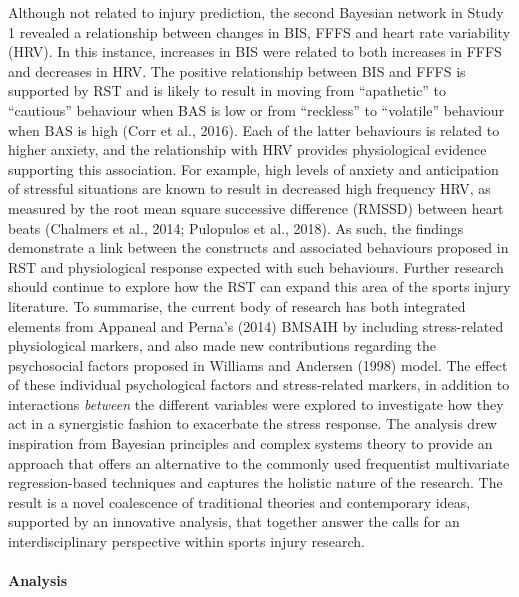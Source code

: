 \documentclass[man,floatsintext]{apa6}
\let\oldparagraph\paragraph
\renewcommand{\paragraph}[1]{\oldparagraph{#1}\mbox{}}
\begin{document}
Although not related to injury prediction, the second Bayesian network in Study 1 revealed a relationship between changes in BIS, FFFS and heart rate variability (HRV).
In this instance, increases in BIS were related to both increases in FFFS and decreases in HRV.
The positive relationship between BIS and FFFS is supported by RST and is likely to result in moving from \enquote{apathetic} to \enquote{cautious} behaviour when BAS is low or from \enquote{reckless} to \enquote{volatile} behaviour when BAS is high (Corr et al., 2016).
Each of the latter behaviours is related to higher anxiety, and the relationship with HRV provides physiological evidence supporting this association. For example, high levels of anxiety and anticipation of stressful situations are known to result in decreased high frequency HRV, as measured by the root mean square successive difference (RMSSD) between heart beats (Chalmers et al., 2014; Pulopulos et al., 2018).
As such, the findings demonstrate a link between the constructs and associated behaviours proposed in RST and physiological response expected with such behaviours.
Further research should continue to explore how the RST can expand this area of the sports injury literature.
To summarise, the current body of research has both integrated elements from Appaneal and Perna's (2014) BMSAIH by including stress-related physiological markers, and also made new contributions regarding the psychosocial factors proposed in Williams and Andersen (1998) model.
The effect of these individual psychological factors and stress-related markers, in addition to interactions \emph{between} the different variables were explored to investigate how they act in a synergistic fashion to exacerbate the stress response.
The analysis drew inspiration from Bayesian principles and complex systems theory to provide an approach that offers an alternative to the commonly used frequentist multivariate regression-based techniques and captures the holistic nature of the research.
The result is a novel coalescence of traditional theories and contemporary ideas, supported by an innovative analysis, that together answer the calls for an interdisciplinary perspective within sports injury research.

\hypertarget{analysis}{%
\paragraph{Analysis}\label{analysis}}
\end{document}
